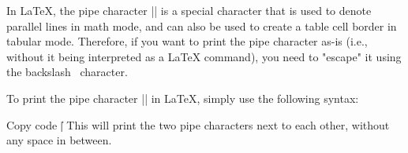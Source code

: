 In LaTeX, the pipe character || is a special character that is used to denote parallel lines in math mode, and can also be used to create a table cell border in tabular mode. Therefore, if you want to print the pipe character as-is (i.e., without it being interpreted as a LaTeX command), you need to "escape" it using the backslash \ character.

To print the pipe character || in LaTeX, simply use the following syntax:

Copy code
\||
This will print the two pipe characters next to each other, without any space in between.
